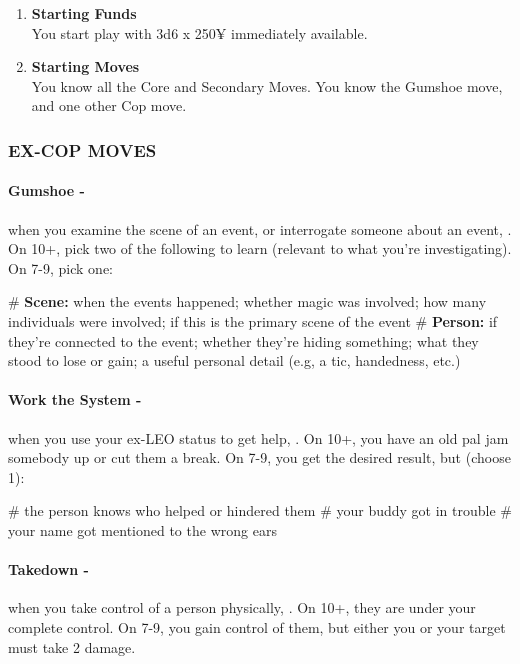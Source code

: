\begin{enumerate}
    \item \textbf{Starting Funds} \\
    You start play with 3d6 x 250¥ immediately available.
    
    \item \textbf{Starting Moves} \\
    You know all the Core and Secondary Moves.
    You know the Gumshoe move, and one other Cop move.
\end{enumerate}

\subsubsection{EX-COP MOVES}
\paragraph{Gumshoe -} when you examine the scene of an event, or interrogate someone about an event, . On 10+, pick two of the following to learn (relevant to what you’re investigating). On 7-9, pick one:
    \begin{easylist}
        # \textbf{Scene:} when the events happened; whether magic was involved; how many individuals were involved; if this is the primary scene of the event
        # \textbf{Person:} if they’re connected to the event; whether they’re hiding something; what they stood to lose or gain; a useful personal detail (e.g, a tic, handedness, etc.)
    \end{easylist}

\paragraph{Work the System -} when you use your ex-LEO status to get help, . On 10+, you have an old pal jam somebody up or cut them a break. On 7-9, you get the desired result, but (choose 1):
    \begin{easylist}
        # the person knows who helped or hindered them
        # your buddy got in trouble
        # your name got mentioned to the wrong ears        
    \end{easylist}

\paragraph{Takedown -} when you take control of a person physically, . On 10+, they are under your complete control. On 7-9, you gain control of them, but either you or your target must take 2 damage.

